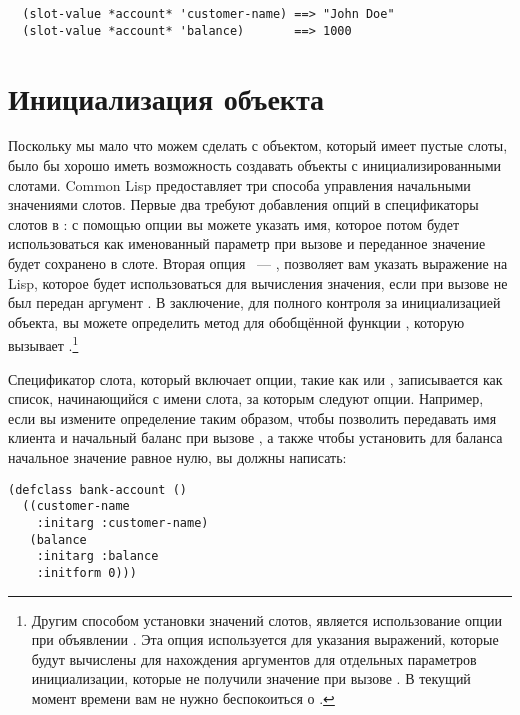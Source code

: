 \begin{verbatim}
  (slot-value *account* 'customer-name) ==> "John Doe"
  (slot-value *account* 'balance)       ==> 1000
\end{verbatim}

\section{Инициализация объекта}

Поскольку мы мало что можем сделать с объектом, который имеет пустые слоты, было бы хорошо
иметь возможность создавать объекты с инициализированными слотами.  Common Lisp
предоставляет три способа управления начальными значениями слотов.  Первые два требуют
добавления опций в спецификаторы слотов в : с помощью опции 
вы можете указать имя, которое потом будет использоваться как именованный параметр при
вызове  и переданное значение будет сохранено в слоте.  Вторая опция
~--- , позволяет вам указать выражение на Lisp, которое будет использоваться
для вычисления значения, если при вызове  не был передан аргумент
 .  В заключение, для полного контроля за инициализацией объекта, вы можете
определить метод для обобщённой функции , которую вызывает
.\footnote{Другим способом установки значений слотов, является
  использование опции  при объявлении .  Эта опция
  используется для указания выражений, которые будут вычислены для нахождения аргументов
  для отдельных параметров инициализации, которые не получили значение при вызове
  .  В текущий момент времени вам не нужно беспокоиться о
  .}

Спецификатор слота, который включает опции, такие как  или
, записывается как список, начинающийся с имени слота, за которым следуют
опции.  Например, если вы измените определение  таким образом, чтобы
позволить передавать имя клиента и начальный баланс при вызове , а
также чтобы установить для баланса начальное значение равное нулю, вы должны написать:

\begin{lstlisting}
(defclass bank-account ()
  ((customer-name
    :initarg :customer-name)
   (balance
    :initarg :balance
    :initform 0)))
\end{lstlisting}

